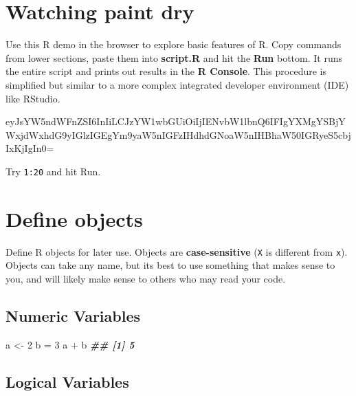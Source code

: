 \documentclass[
]{book}
\newenvironment{Shaded}{\begin{snugshade}}{\end{snugshade}}
\newcommand{\DecValTok}[1]{\textcolor[rgb]{0.00,0.00,0.81}{#1}}
\newcommand{\DocumentationTok}[1]{\textcolor[rgb]{0.56,0.35,0.01}{\textbf{\textit{#1}}}}
\newcommand{\NormalTok}[1]{#1}
\newcommand{\OtherTok}[1]{\textcolor[rgb]{0.56,0.35,0.01}{#1}}
\newcommand{\SpecialCharTok}[1]{\textcolor[rgb]{0.00,0.00,0.00}{#1}}
\begin{document}
\hypertarget{watching-paint-dry}{%
\section*{Watching paint dry}\label{watching-paint-dry}}

Use this R demo in the browser to explore basic features of R. Copy commands from lower sections, paste them into \textbf{script.R} and hit the \textbf{Run} bottom. It runs the entire script and prints out results in the \textbf{R Console}. This procedure is simplified but similar to a more complex integrated developer environment (IDE) like RStudio.

eyJsYW5ndWFnZSI6InIiLCJzYW1wbGUiOiIjIENvbW1lbnQ6IFIgYXMgYSBjYWxjdWxhdG9yIGlzIGEgYm9yaW5nIGFzIHdhdGNoaW5nIHBhaW50IGRyeS5cbjIxKjIgIn0=

Try \texttt{1:20} and hit Run.

\hypertarget{define-objects}{%
\section*{Define objects}\label{define-objects}}

Define R objects for later use. Objects are \textbf{case-sensitive} (\texttt{X} is different from \texttt{x}). Objects can take any name, but its best to use something that makes sense to you, and will likely make sense to others who may read your code.

\hypertarget{numeric-variables}{%
\subsection*{Numeric Variables}\label{numeric-variables}}

\begin{Shaded}
\begin{Highlighting}[]
\NormalTok{a }\OtherTok{\textless{}{-}} \DecValTok{2}
\NormalTok{b }\OtherTok{=} \DecValTok{3}
\NormalTok{a }\SpecialCharTok{+}\NormalTok{ b}
\DocumentationTok{\#\# [1] 5}
\end{Highlighting}
\end{Shaded}

\hypertarget{logical-variables}{%
\subsection*{Logical Variables}\label{logical-variables}}
\end{document}
